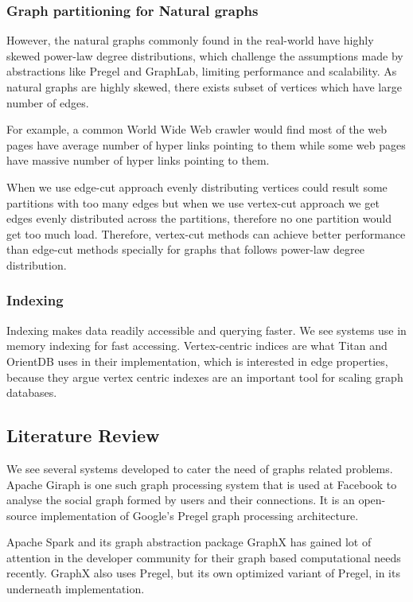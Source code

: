 \documentclass[12pt]{article}
\begin{document}
\subsubsection{Graph partitioning for Natural graphs}

However, the natural graphs commonly found in the real-world have highly skewed power-law degree distributions, which challenge the assumptions made by abstractions like  Pregel and GraphLab, limiting performance and scalability. As natural graphs are highly skewed, there exists subset of vertices which have large number of edges. 

For example, a common World Wide Web crawler would find most of the web pages have average number of hyper links pointing to them while some web pages have massive number of hyper links pointing to them. 

When we use edge-cut approach evenly distributing vertices could result some partitions with too many edges but when we use vertex-cut approach we get edges evenly distributed across the partitions, therefore no one partition would get too much load. Therefore, vertex-cut methods can achieve better performance than edge-cut methods\cite{PowerGraph} specially for graphs that follows power-law degree distribution.

\subsubsection{Indexing}
Indexing makes data readily accessible and querying faster. We see systems use in memory indexing for fast accessing. Vertex-centric indices are what Titan and OrientDB uses in their implementation, which is interested in edge properties, because they argue vertex centric indexes are an important tool for scaling graph databases.

\subsection{Literature Review}

We see several systems developed to cater the need of graphs related problems. Apache Giraph is one such graph processing system that is used at Facebook to analyse the social graph formed by users and their connections. It is an open-source implementation of Google’s Pregel\cite{Pregel} graph processing architecture. 

Apache Spark and its graph abstraction package GraphX\cite{GraphX} has gained lot of attention in the developer community for their graph based computational needs recently. GraphX also uses Pregel, but its own optimized variant of Pregel, in its underneath implementation.
\end{document}
